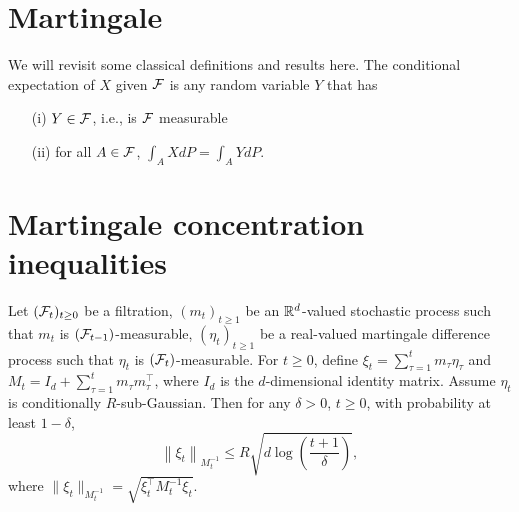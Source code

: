 \section{Martingale}

We will revisit some classical definitions and results here. 
The conditional expectation of $X$ given $\mathcal{F}$ is any random variable $Y$ that has 
\begin{itemize}
    \item[(i)] $Y\in \mathcal{F}$, i.e., is $\mathcal{F}$ measurable
    \item[(ii)] for all $A \in \mathcal{F}$, $\int_{A} X dP = \int_{A} Y dP$.  
\end{itemize}













\section{Martingale concentration inequalities}

\begin{lemma} \label{lem:self-norm}
    Let $(\mathcal{F}_t)_{t\geq 0}$ be a filtration, $(m_t)_{t\geq 1}$ be an $\mathbb{R}^d$-valued stochastic process such that $m_t$ is $(\mathcal{F}_{t-1})$-measurable, $(\eta_t)_{t\geq 1}$ be a real-valued martingale difference process such that $\eta_t$ is $(\mathcal{F}_t)$-measurable. 
For $t \geq 0$, define $\xi_t = \sum_{\tau=1}^t m_\tau \eta_{\tau}$ and $M_t = I_d + \sum_{\tau=1}^t m_\tau m_\tau^\top$, where $I_d$ is the $d$-dimensional identity matrix. Assume $\eta_t$ is conditionally $R$-sub-Gaussian. Then for any $\delta > 0$, $t \geq 0$, with probability at least $1 - \delta$, 
\begin{equation*}
    \left\|\xi_t\right\|_{M_t^{-1}} \leq R \sqrt{d \log \left(\frac{t+1}{\delta}\right)},
\end{equation*}
where $\|\xi_t\|_{M_t^{-1}} = \sqrt{\xi_t^\top M_t^{-1} \xi_t}$. 
\end{lemma}
























